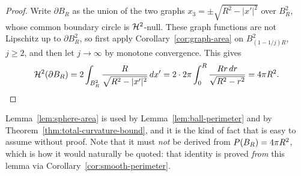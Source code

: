\begin{proof}
Write $\partial B_R$ as the union of the two graphs
$x_3=\pm\sqrt{R^2-|x'|^2}$ over $B_R^2$, whose common boundary circle is
$\mathcal H^2$-null.  These graph functions are not Lipschitz up to
$\partial B_R^2$, so first apply Corollary~\ref{cor:graph-area} on
$B_{(1-1/j)R}^2$, $j\ge2$, and then let $j\to\infty$ by monotone
convergence.  This gives
\[
  \mathcal H^2(\partial B_R)
  =2\int_{B_R^2}\frac{R}{\sqrt{R^2-|x'|^2}}\,dx'
  =2\cdot2\pi\int_0^R\frac{Rr\,dr}{\sqrt{R^2-r^2}}
  =4\pi R^2 .
\]
\end{proof}

\begin{fnote}\label{fnote:sphere-area}
Lemma~\ref{lem:sphere-area} is used by
Lemma~\ref{lem:ball-perimeter} and by
Theorem~\ref{thm:total-curvature-bound}, and it is the kind of fact that is
easy to assume without proof.  Note that it must \emph{not} be derived from
$P(B_R)=4\pi R^2$, which is how it would naturally be quoted: that identity
is proved \emph{from} this lemma via
Corollary~\ref{cor:smooth-perimeter}.
\end{fnote}

